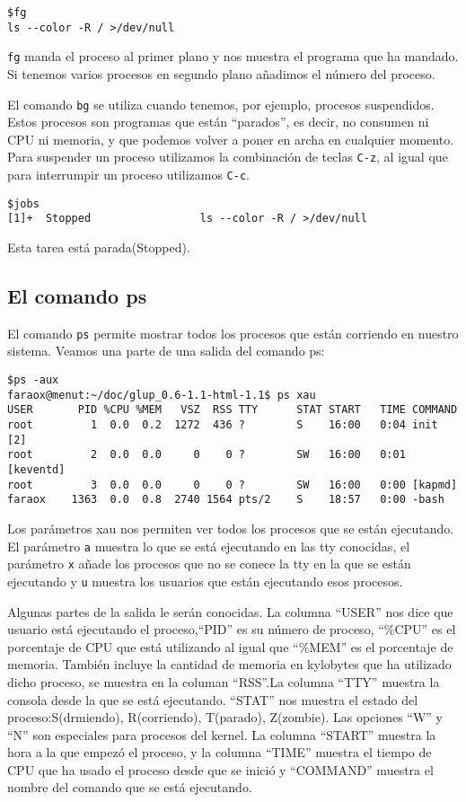 \begin{verbatim}
$fg
ls --color -R / >/dev/null
\end{verbatim}

{\tt fg}  manda el proceso al  primer plano y nos  muestra el programa
que ha mandado.  Si tenemos varios procesos en  segundo plano añadimos
el número del proceso.

El comando {\tt  bg} se utiliza cuando tenemos,  por ejemplo, procesos
suspendidos. Estos  procesos son  programas que están  ``parados'', es
decir, no consumen ni CPU ni memoria,  y que podemos volver a poner en
archa en cualquier  momento. Para suspender un  proceso utilizamos la
combinación de teclas {\tt C-z}, al igual que para interrumpir un
proceso utilizamos {\tt C-c}.

\begin{verbatim}
$jobs
[1]+  Stopped                 ls --color -R / >/dev/null
\end{verbatim}

Esta tarea está parada(Stopped).

\subsection{El comando ps}

El  comando {\tt  ps} permite  mostrar  todos los  procesos que  están
corriendo  en nuestro  sistema. Veamos  una  parte de  una salida  del
comando ps:

\begin{verbatim}
$ps -aux
faraox@menut:~/doc/glup_0.6-1.1-html-1.1$ ps xau
USER       PID %CPU %MEM   VSZ  RSS TTY      STAT START   TIME COMMAND
root         1  0.0  0.2  1272  436 ?        S    16:00   0:04 init [2] 
root         2  0.0  0.0     0    0 ?        SW   16:00   0:01 [keventd]
root         3  0.0  0.0     0    0 ?        SW   16:00   0:00 [kapmd]
faraox    1363  0.0  0.8  2740 1564 pts/2    S    18:57   0:00 -bash
\end{verbatim}

Los parámetros  xau nos permiten ver  todos los procesos que  se están
ejecutando. El parámetro {\tt a} muestra  lo que se está ejecutando en
las tty conocidas,  el parámetro {\tt x} añade los  procesos que no se
conece la  tty en  la que se  están ejecutando y  {\tt u}  muestra los
usuarios que están ejecutando esos procesos.

Algunas partes  de la salida  le serán conocidas. La  columna ``USER''
nos dice que  usuario está ejecutando el proceso,``PID''  es su número
de proceso, ``\%CPU''  es el porcentaje de CPU que  está utilizando al
igual que  ``\%MEM'' es el  porcentaje de memoria. También  incluye la
cantidad de  memoria en kylobytes  que ha utilizado dicho  proceso, se
muestra en  la columan ``RSS''.La  columna ``TTY'' muestra  la consola
desde la  que se está ejecutando.  ``STAT'' nos muestra el  estado del
proceso:S(drmiendo), R(corriendo), T(parado),  Z(zombie). Las opciones
``W''  y ``N''  son especiales  para procesos  del kernel.  La columna
``START'' muestra  la hora a  la que empezó  el proceso, y  la columna
``TIME'' muestra el tiempo de CPU que ha usado el proceso desde que se
inició  y  ``COMMAND'' muestra  el  nombre  del  comando que  se  está
ejecutando.

